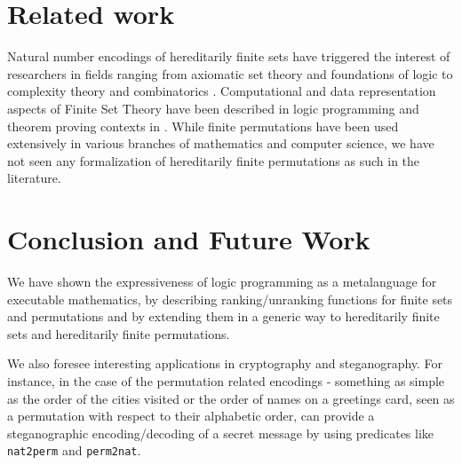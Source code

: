 \documentclass[]{INCLUDES/llncs}
\begin{document}
\begin{comment}
Assuming both are usual visitors of the two chatrooms, well known to just talk
as much nonsense as anyone else - no content or behavioral scanning of any of
the chatrooms can indicate that the hereditarily finite permutation is the
encoding of a bank account where they have deposited drug money to be
laundered by their friend Carlos.

Besides steganography, similar techniques can be used to provide invisible
digital watermarks to assert ownership of media content.
\end{comment}

\section{Related work} \label{related}
Natural number encodings of hereditarily finite sets have 
triggered the interest of researchers in fields ranging from 
axiomatic set theory and foundations of logic to 
complexity theory and combinatorics
\cite{finitemath,kaye07,abian78,DBLP:journals/jct/MeirMM83,avigad97}. 
Computational and data representation aspects of Finite Set Theory 
have been described in logic programming and theorem proving contexts 
in \cite{dovier00comparing,DBLP:journals/tplp/PiazzaP04,DBLP:conf/types/Paulson94}. 
While finite permutations have been used extensively in various branches of
mathematics and computer science, we have not seen any formalization of 
hereditarily finite permutations as such in the literature.

\section{Conclusion and Future Work} \label{concl}

We have shown the expressiveness of logic programming as a
metalanguage for executable mathematics, by describing
ranking/unranking functions
for finite sets and permutations and by extending them in a
generic way to hereditarily finite sets
and hereditarily finite permutations.

We also foresee interesting applications in cryptography and steganography. 
For instance, in the case of the permutation related encodings -  something as
simple as the order of the cities visited or the order of names 
on a greetings card, seen as a permutation with respect to their 
alphabetic order, can provide a steganographic encoding/decoding of a secret
message by using predicates like {\tt nat2perm} and {\tt perm2nat}.
\end{document}
